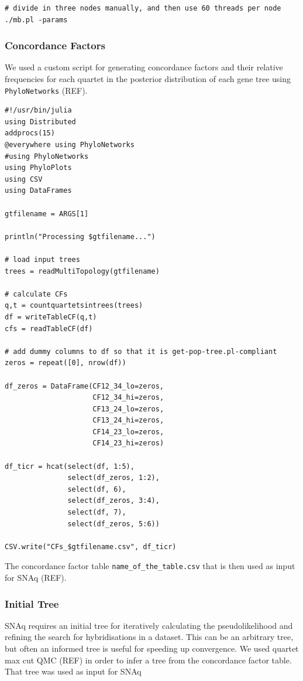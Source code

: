 \documentclass[utf8]{frontiers_suppmat} %
\begin{document}
\begin{verbatim}
# divide in three nodes manually, and then use 60 threads per node
./mb.pl -params
\end{verbatim}

\subsubsection{Concordance Factors}

We used a custom script for generating concordance factors and their relative frequencies for each quartet in the posterior distribution of each gene tree using \texttt{PhyloNetworks} (REF).

\begin{verbatim}
#!/usr/bin/julia
using Distributed
addprocs(15)
@everywhere using PhyloNetworks
#using PhyloNetworks
using PhyloPlots
using CSV
using DataFrames

gtfilename = ARGS[1]

println("Processing $gtfilename...")

# load input trees
trees = readMultiTopology(gtfilename)

# calculate CFs
q,t = countquartetsintrees(trees)
df = writeTableCF(q,t)
cfs = readTableCF(df)

# add dummy columns to df so that it is get-pop-tree.pl-compliant
zeros = repeat([0], nrow(df))

df_zeros = DataFrame(CF12_34_lo=zeros,
                     CF12_34_hi=zeros,
                     CF13_24_lo=zeros,
                     CF13_24_hi=zeros,
                     CF14_23_lo=zeros,
                     CF14_23_hi=zeros)

df_ticr = hcat(select(df, 1:5),
               select(df_zeros, 1:2),
               select(df, 6),
               select(df_zeros, 3:4),
               select(df, 7),
               select(df_zeros, 5:6))

CSV.write("CFs_$gtfilename.csv", df_ticr)
\end{verbatim}

The concordance factor table \texttt{name\_of\_the\_table.csv} that is then used as input for SNAq (REF).

\subsubsection{Initial Tree}

SNAq requires an initial tree for iteratively calculating the pseudolikelihood and refining the search for hybridisations in a dataset. This can be an arbitrary tree, but often an informed tree is useful for speeding up convergence. We used quartet max cut QMC (REF) in order to infer a tree from the concordance factor table. That tree was used as input for SNAq
\end{document}
